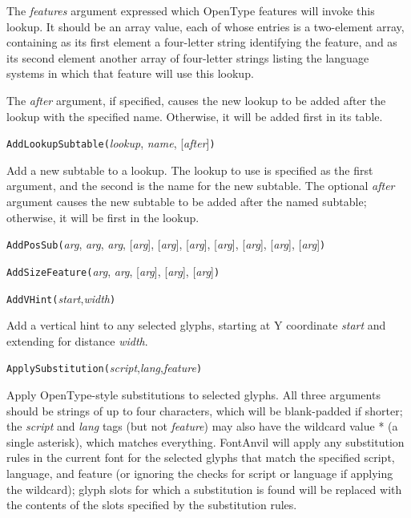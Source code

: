 The \textit{features} argument expressed which OpenType features
will invoke this lookup.  It should be an array value, each of whose entries
is a two-element array, containing as its first element a four-letter string
identifying the feature, and as its second element another array of
four-letter strings listing the language systems in which that feature will
use this lookup.

The \textit{after} argument, if specified, causes the new lookup to be added
after the lookup with the specified name.  Otherwise, it will be added first
in its table.



\texttt{AddLookupSubtable(}\textit{lookup}, \textit{name}, [\textit{after}]\texttt{)}

Add a new subtable to a lookup.  The lookup to use is specified as the first
argument, and the second is the name for the new subtable.  The optional
\textit{after} argument causes the new subtable to be added after the named
subtable; otherwise, it will be first in the lookup.



\texttt{AddPosSub(}\textit{arg}, \textit{arg}, \textit{arg}, [\textit{arg}], [\textit{arg}], [\textit{arg}], [\textit{arg}], [\textit{arg}], [\textit{arg}], [\textit{arg}]\texttt{)}



\texttt{AddSizeFeature(}\textit{arg}, \textit{arg}, [\textit{arg}], [\textit{arg}], [\textit{arg}]\texttt{)}



\texttt{AddVHint(}\textit{start},\textit{width}\texttt{)}

Add a vertical hint to any selected glyphs, starting at Y coordinate
\textit{start} and extending for distance \textit{width}.



\texttt{ApplySubstitution(}\textit{script},\textit{lang},\textit{feature}\texttt{)}

Apply OpenType-style substitutions to selected glyphs.  All three arguments
should be strings of up to four characters, which will be blank-padded if
shorter; the \textit{script} and \textit{lang} tags (but not
\textit{feature}) may also have the wildcard value * (a single asterisk),
which matches everything.  FontAnvil will apply any substitution rules in
the current font for the selected glyphs that match the specified script,
language, and feature (or ignoring the checks for script or language if
applying the wildcard); glyph slots for which a substitution is found will
be replaced with the contents of the slots specified by the substitution
rules.

